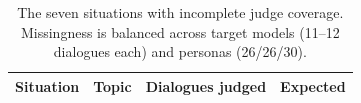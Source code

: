 \begin{table}[t]
\centering
\small
\caption{The seven situations with incomplete judge coverage. Missingness is balanced across target models (11--12 dialogues each) and personas (26/26/30).}
\label{tab:incomplete}
\begin{tabular}{lrrr}
\toprule
Situation & Topic & Dialogues judged & Expected \\
\midrule
\bottomrule
\end{tabular}
\end{table}
